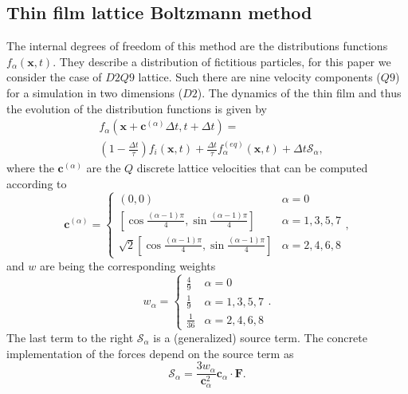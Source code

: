 \documentclass[twocolumn,amsmath,amssymb,showpacs,pre,nofootinbib,superscriptaddress]{revtex4-1} %
\begin{document}
\subsection{Thin film lattice Boltzmann method}\label{subsec:LBM}
The internal degrees of freedom of this method are the distributions functions $f_{\alpha}(\mathbf{x},t)$.
They describe a distribution of fictitious particles, for this paper we consider the case of $D2Q9$ lattice.
Such there are nine velocity components ($Q9$) for a simulation in two dimensions ($D2$).
The dynamics of the thin film and thus the evolution of the distribution functions is given by
\begin{equation}\label{eq:LBE}
    \begin{split}
        &f_{\alpha}(\mathbf{x}+\mathbf{c}^{({\alpha})}\Delta t,t+\Delta t) = \\
        &\left(1 - \frac{\Delta t}{\tau}\right) f_i(\mathbf{x},t) + \frac{\Delta t}{\tau} f_{\alpha}^{(eq)}(\mathbf{x},t) + \Delta t\mathcal{S}_{\alpha},
    \end{split}
\end{equation}
where the $\mathbf{c}^{({\alpha})}$ are the $Q$ discrete lattice velocities that can be computed according to
\begin{equation}\label{eq:speeds}
\mathbf{c}^{({\alpha})}  =
\left\{
\begin{array}{ll}
(0,0) & \alpha = 0 \\
\left[\cos{\frac{(\alpha-1)\pi}{4}}, \sin{\frac{(\alpha-1)\pi}{4}} \right] &  \alpha=1,3,5,7 \\
\sqrt{2}\left[\cos{\frac{(\alpha-1)\pi}{4}}, \sin{\frac{(\alpha-1)\pi}{4}} \right] & \alpha=2,4,6,8
\end{array}
\right.,
\end{equation}
and $w$ are being the corresponding weights
\begin{equation}
w_{\alpha}  =
\left\{
\begin{array}{ll}
\frac{4}{9} & \alpha = 0 \\
\frac{1}{9} &  \alpha=1,3,5,7 \\
\frac{1}{36} & \alpha=2,4,6,8
\end{array}
\right..
\end{equation}
The last term to the right $\mathcal{S}_{\alpha}$ is a (generalized) source term.
The concrete implementation of the forces depend on the source term as~\cite{https://doi.org/10.1002/fld.4726}
\begin{equation}\label{eq:source_term}
    \mathcal{S}_{\alpha} = \frac{3w_{\alpha}}{\mathbf{c}_{\alpha}^2}\mathbf{c}_{\alpha}\cdot\mathbf{F}.
\end{equation}
\end{document}
